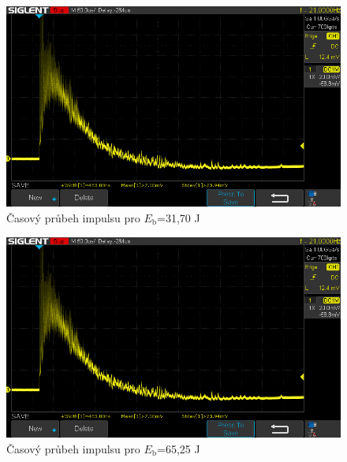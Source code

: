 \begin{figure}[H] 
	\centering
	\includegraphics[scale = 0.5]{img/SDS00004.png} 
	\caption{Časový průbeh impulsu pro $E_\mathrm{b}$=31,70 J} 
	\label{fig:cas_2}
\end{figure}

\begin{figure}[H] 
	\centering
	\includegraphics[scale = 0.5]{img/SDS00004.png} 
	\caption{Časový průbeh impulsu pro $E_\mathrm{b}$=65,25 J} 
	\label{fig:cas_3}
\end{figure}


